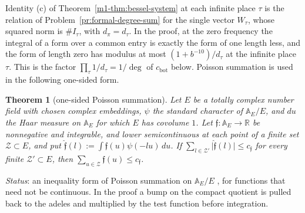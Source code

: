 \documentclass[reqno]{amsart}
\theoremstyle{definition}
\theoremstyle{plain}
\newtheorem{theorem}{Theorem}[section]
\theoremstyle{remark}
\newcommand{\R}{\mathbb{R}}
\newcommand{\A}{\mathbb{A}}
\newcommand{\Zc}{\mathcal{Z}}
\begin{document}
Identity (c) of Theorem~\ref{m1-thm:bessel-system} at each infinite place \(\tau\) is the relation of Problem~\ref{pr:formal-degree-sum} for the single vector \(W_\tau\), whose squared norm is \(\#I_\tau\), with \(d_\pi=d_\tau\).  In the proof, at the zero frequency the integral of a form over a common entry is exactly the form of one length less, and the form of length zero has modulus at most \((1+b^{-10})/d_\tau\) at the infinite place \(\tau\).  This is the factor \(\prod_\tau1/d_\tau=1/\deg\) of \(c_{\mathrm{bot}}\) below.  Poisson summation is used in the following one-sided form.

\begin{theorem}[one-sided Poisson summation]\label{thm:poisson}
Let \(E\) be a totally complex number field with chosen complex embeddings, \(\psi\) the standard character of \(\A_E/E\), and \(du\) the Haar measure on \(\A_E\) for which \(E\) has covolume \(1\).  Let \(\mathfrak f\colon\A_E\to\R\) be nonnegative and integrable, and lower semicontinuous at each point of a finite set \(\Zc\subset E\), and put \(\hat{\mathfrak f}(l):=\int\mathfrak f(u)\psi(-lu)\,du\).  If \(\sum_{l\in\Zc'}\lvert\hat{\mathfrak f}(l)\rvert\le c_{\mathfrak f}\) for every finite \(\Zc'\subset E\), then \(\sum_{u\in\Zc}\mathfrak f(u)\le c_{\mathfrak f}\).
\end{theorem}

\noindent\emph{Status}: an inequality form of Poisson summation on \(\A_E/E\) \cite{Ta}, for functions that need not be continuous.  In the proof a bump on the compact quotient is pulled back to the adeles and multiplied by the test function before integration.
\end{document}
